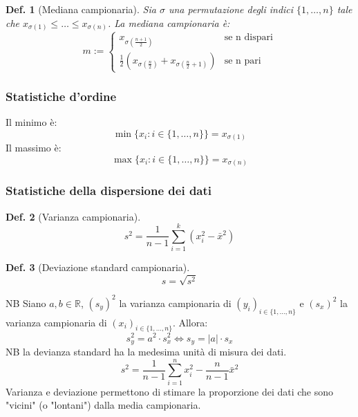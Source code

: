 \documentclass{article}
\newtheorem{definition}{Def.}[section]
\begin{document}
\begin{definition}[Mediana campionaria] Sia $\sigma$ una permutazione degli indici
$\{1, \dots, n\}$ tale che $x_{\sigma(1)} \leq \dots \leq x_{\sigma(n)}$. 
La mediana campionaria è:
\begin{equation}
	m :=
\begin{cases}
	x_{\sigma(\frac{n+1}{2})} & \text{se n dispari} \\
	\frac{1}{2}(x_{\sigma(\frac{n}{2})} + x_{\sigma(\frac{n}{2}+1)}) & \text{se n pari}
\end{cases}
\end{equation}
\end{definition}

\subsubsection{Statistiche d'ordine}
Il minimo è:
\begin{equation}
	\min\{x_i: i \in \{1, \dots, n\}\} = x_{\sigma(1)}
\end{equation}
Il massimo è:
\begin{equation}
	\max\{x_i: i \in \{1, \dots, n\}\} = x_{\sigma(n)}
\end{equation}

\subsubsection{Statistiche della dispersione dei dati}
\begin{definition}[Varianza campionaria]
\begin{equation}
	s^2 = \frac{1}{n-1} \sum_{i=1}^k (x_i^2 - \bar{x}^2)
\end{equation}
\end{definition}

\begin{definition}[Deviazione standard campionaria]
\begin{equation}
	s = \sqrt{s^2}
\end{equation}
\end{definition}

NB Siano $a, b \in \mathbb{R}$, $(s_y)^2$ la varianza campionaria di $(y_i)_{i
\in \{1, \dots, n\}}$ e $(s_x)^2$ la varianza campionaria di $(x_i)_{i \in
\{1, \dots, n\}}$. Allora:
\begin{equation}
	s_y^2 = a ^ 2 \cdot s_x^2 \iff s_y = |a| \cdot s_x
\end{equation}
NB la devianza standard ha la medesima unità di misura dei dati.
\begin{equation}
	s^2 = \frac{1}{n-1} \sum_{i=1}^n x_i^2 - \frac{n}{n-1} \bar{x}^2
\end{equation}
Varianza e deviazione permettono di stimare la proporzione dei dati che sono
"vicini" (o "lontani") dalla media campionaria.
\end{document}
